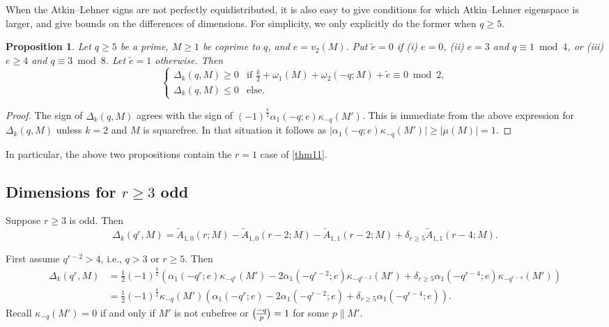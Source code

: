 \documentclass[11pt]{amsart}
\renewcommand{\mod}{\bmod}
\newcommand{\leg}{\overwithdelims ()}
\numberwithin{lem}{section}
\newtheorem{prop}[lem]{Proposition}
\theoremstyle{remark}
\theoremstyle{definition}
\numberwithin{equation}{section}
\begin{document}
When the Atkin--Lehner signs are not perfectly equidistributed, it is also easy to give conditions for which Atkin--Lehner eigenspace is larger, and give bounds on the differences of dimensions.  For simplicity, we only explicitly do the former when $q \ge 5$.

\begin{prop}
Let $q \ge 5$ be a prime, $M \ge 1$ be coprime to $q$, and $e = v_2(M)$.
Put $\tilde e = 0$ if (i) $e = 0$, (ii) $e = 3$ and $q \equiv 1 \mod 4$, or (iii) $e \ge 4$ and $q \equiv 3 \mod 8$.  Let $\tilde e = 1$ otherwise.
Then
\[ \begin{cases}
\Delta_k(q,M) \ge 0 & \text{if } 
\frac k2 + \omega_1(M) + \omega_2(-q; M) + \tilde e \equiv 0 \mod 2, \\
\Delta_k(q,M) \le 0 & \text{else}.
\end{cases} \]
\end{prop}

\begin{proof}
The sign of $\Delta_k(q,M)$ agrees with the sign of 
$(-1)^{\frac k2} \alpha_1(-q; e) \kappa_{-q}(M')$.  This is immediate from the above expression for $\Delta_k(q,M)$ unless $k = 2$ and $M$ is squarefree.  In that situation it follows as
$\lvert \alpha_1(-q; e) \kappa_{-q}(M') \rvert \ge \lvert \mu(M) \rvert = 1$.
\end{proof}

In particular, the above two propositions contain the $r=1$ case of \cref{thm11}.

\subsection{Dimensions for $r \ge 3$ odd}
Suppose $r \ge 3$ is odd.  Then
\[ \Delta_k(q^r,M) =
\tilde A_{1,0}(r;M) - \tilde A_{1,0}(r-2;M) - \tilde A_{1,1}(r-2;M) + \delta_{r \ge 5} \tilde A_{1,1}(r-4;M). \]

First assume $q^{r-2} > 4$, i.e., $q > 3$ or $r \ge 5$.  Then
\begin{align*}  \Delta_k(q^r,M)  &=
\frac 12(-1)^{\frac k2} \left( \alpha_1(-q^r; e) \kappa_{-q^r}(M') - 2\alpha_1(-q^{r-2}; e) \kappa_{-q^{r-2}}(M') + \delta_{r \ge 5} \alpha_1(-q^{r-4}; e) \kappa_{-q^{r-4}}(M')
\right) \\
&= \frac 12(-1)^{\frac k2} \kappa_{-q}(M') \left( \alpha_1(-q^r; e)  - 2\alpha_1(-q^{r-2}; e)  + \delta_{r \ge 5} \alpha_1(-q^{r-4}; e) \right).
\end{align*}
Recall $\kappa_{-q}(M') = 0$ if and only if $M'$ is not cubefree or ${-q \leg p} = 1$ for some $p \parallel M'$.
\end{document}
